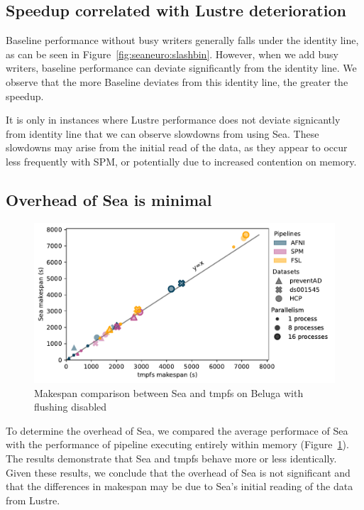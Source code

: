\subsection{Speedup correlated with Lustre deterioration}

Baseline performance without busy writers generally falls under the identity
line, as can be seen in Figure~\ref{fig:seaneuro:slashbin}. However, when we add
busy writers, baseline performance can deviate significantly from the identity
line. We observe that the more Baseline deviates from this identity line, the
greater the speedup.

It is only in instances where Lustre performance does not deviate signicantly from
identity line that we can observe slowdowns from using Sea. These slowdowns
may arise from the initial read of the data, as they appear to occur less frequently
with SPM, or potentially due to increased contention on memory.



\subsection{Overhead of Sea is minimal}


\begin{figure}
\centering
\includegraphics[width=\columnwidth]{figures/sea-neuro/beluga_sea_tmpfs.pdf}%
\caption{Makespan comparison between Sea and tmpfs on Beluga with flushing disabled}
\label{fig:seaneuro:tmpfs}
\end{figure}

To determine the overhead of Sea, we compared the average performace of Sea with
the performance of pipeline executing entirely within memory
(Figure~\ref{fig:seaneuro:tmpfs}). The results demonstrate that Sea and tmpfs
behave more or less identically. Given these results, we conclude that the
overhead of Sea is not significant and that the differences in makespan may be
due to Sea's initial reading of the data from Lustre.


